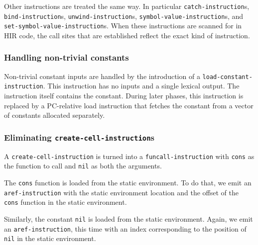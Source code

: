 Other instructions are treated the same way.  In particular
\texttt{catch-instruction}s, \texttt{bind-instruction}s,
\texttt{unwind-instruction}s, \texttt{symbol-value-instruction}s, and
\texttt{set-symbol-value-instruction}s.  When these instructions are
scanned for in HIR code, the call sites that are established reflect
the exact kind of instruction.

\subsubsection{Handling non-trivial constants}

Non-trivial constant inputs are handled by the introduction of a
\texttt{load-constant-instruction}.  This instruction has no inputs
and a single lexical output.  The instruction itself contains the
constant.  During later phases, this instruction is replaced by a
PC-relative load instruction that fetches the constant from a vector
of constants allocated separately.

\subsubsection{Eliminating \texttt{create-cell-instruction}s}

A \texttt{create-cell-instruction} is turned into a
\texttt{funcall-instruction} with \texttt{cons} as the function to
call and \texttt{nil} as both the arguments.

The \texttt{cons} function is loaded from the static environment.  To
do that, we emit an \texttt{aref-instruction} with the static
environment location and the offset of the \texttt{cons} function in
the static environment.

Similarly, the constant \texttt{nil} is loaded from the static
environment.  Again, we emit an \texttt{aref-instruction}, this time with
an index corresponding to the position of \texttt{nil} in the
static environment.%

